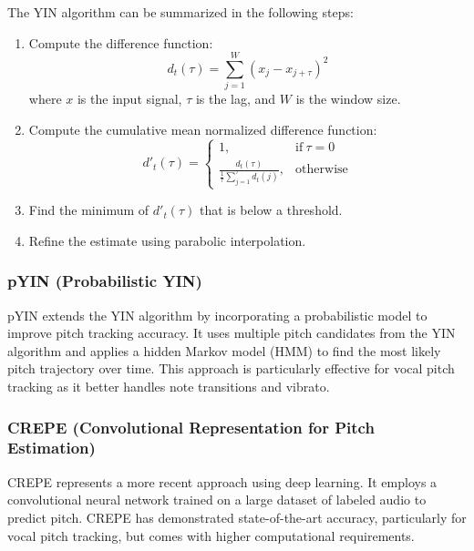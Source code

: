 \documentclass[conference]{IEEEtran}
\begin{document}
The YIN algorithm can be summarized in the following steps:
\begin{enumerate}
    \item Compute the difference function:
    \begin{equation}
    d_t(\tau) = \sum_{j=1}^{W} (x_j - x_{j+\tau})^2
    \end{equation}
    where $x$ is the input signal, $\tau$ is the lag, and $W$ is the window size.
    
    \item Compute the cumulative mean normalized difference function:
    \begin{equation}
    d'_t(\tau) = 
    \begin{cases}
    1, & \text{if}\ \tau = 0 \\
    \frac{d_t(\tau)}{\frac{1}{\tau}\sum_{j=1}^{\tau}d_t(j)}, & \text{otherwise}
    \end{cases}
    \end{equation}
    
    \item Find the minimum of $d'_t(\tau)$ that is below a threshold.
    
    \item Refine the estimate using parabolic interpolation.
\end{enumerate}

\subsubsection{pYIN (Probabilistic YIN)}
pYIN \cite{mauch2014pyin} extends the YIN algorithm by incorporating a probabilistic model to improve pitch tracking accuracy. It uses multiple pitch candidates from the YIN algorithm and applies a hidden Markov model (HMM) to find the most likely pitch trajectory over time. This approach is particularly effective for vocal pitch tracking as it better handles note transitions and vibrato.

\subsubsection{CREPE (Convolutional Representation for Pitch Estimation)}
CREPE \cite{kim2018crepe} represents a more recent approach using deep learning. It employs a convolutional neural network trained on a large dataset of labeled audio to predict pitch. CREPE has demonstrated state-of-the-art accuracy, particularly for vocal pitch tracking, but comes with higher computational requirements.
\end{document}
